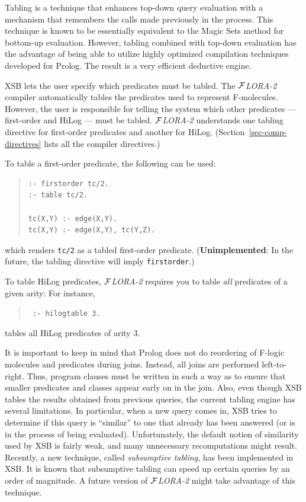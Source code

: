 \documentclass[11pt]{article}
\newcommand{\FLORA}{{\mbox{${\cal F}${\small\it LORA}\rm\emph{-2}}}\xspace}
\newcommand{\fl}{\mbox{F-logic}\xspace}
\begin{document}
%
Tabling is a technique that enhances top-down query evaluation with a
mechanism that remembers the calls made previously in the process.  This
technique is known to be essentially equivalent to the Magic Sets method
for bottom-up evaluation. However, tabling combined with top-down
evaluation has the advantage of being able to utilize highly optimized
compilation techniques developed for Prolog. The result is a very efficient
deductive engine.

XSB lets the user specify which predicates must be tabled.  The \FLORA
compiler automatically tables the predicates used to represent F-molecules.
However, the user is responsible for telling the system which other
predicates --- first-order and HiLog --- must be tabled.  \FLORA
understands one tabling directive for first-order predicates and another
for HiLog.  (Section~\ref{sec-comp-directives} lists all the compiler
directives.)

%
To table a first-order predicate, the following can be used:
\begin{quote}
\begin{verbatim}
:- firstorder tc/2.
:- table tc/2.

tc(X,Y) :- edge(X,Y).
tc(X,Y) :- edge(X,Y), tc(Y,Z).
\end{verbatim}
\end{quote}
which renders {\tt tc/2}  as a tabled first-order predicate.
({\bf Unimplemented}: In the future, the tabling directive will imply {\tt firstorder}.)

To table HiLog predicates, \FLORA requires you to table \emph{all}
predicates of a given arity: For instance,
\begin{quote}
 \tt
 :- hilogtable 3.
\end{quote}
tables all HiLog predicates of arity 3.

It is important to keep in mind that Prolog does not do reordering of \fl
molecules and predicates during joins. Instead, all joins are performed
left-to-right.  Thus, program clauses must be written in such a way as to
ensure that smaller predicates and classes appear early on in the join.
Also, even though XSB tables the results obtained from previous queries,
the current tabling engine has several limitations. In particular, when a
new query comes in, XSB tries to determine if this query is ``similar'' to
one that already has been answered (or is in the process of being
evaluated).  Unfortunately, the default notion of similarity used by XSB is
fairly weak, and many unnecessary recomputations might result. Recently, a
new technique, called \emph{subsumptive tabling}, has been implemented in
XSB. It is known that subsumptive tabling can speed up certain queries by
an order of magnitude. A future version of \FLORA might take advantage of
this technique.
\end{document}
